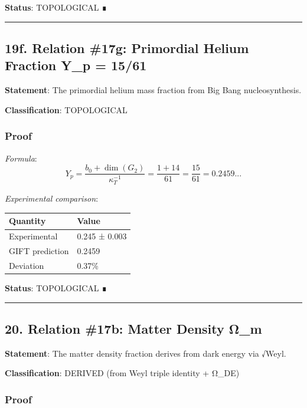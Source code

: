 \documentclass[11pt,a4paper]{article}
\begin{document}
\textbf{Status}: TOPOLOGICAL ∎

\begin{center}\rule{0.5\linewidth}{0.5pt}\end{center}

\subsection{19f. Relation \#17g: Primordial Helium Fraction Y\_p = 15/61}\label{f.-relation-17g-primordial-helium-fraction-y_p-1561}

\textbf{Statement}: The primordial helium mass fraction from Big Bang nucleosynthesis.

\textbf{Classification}: TOPOLOGICAL

\subsubsection{Proof}\label{proof-26}

\emph{Formula}:
\[Y_p = \frac{b_0 + \dim(G_2)}{\kappa_T^{-1}} = \frac{1 + 14}{61} = \frac{15}{61} = 0.2459...\]

\emph{Experimental comparison}:

{\def\LTcaptype{none} %
\begin{longtable}[]{@{}ll@{}}
\toprule\noalign{}
Quantity & Value \\
\midrule\noalign{}
\endhead
\bottomrule\noalign{}
\endlastfoot
Experimental & 0.245 ± 0.003 \\
GIFT prediction & 0.2459 \\
Deviation & 0.37\% \\
\end{longtable}
}

\textbf{Status}: TOPOLOGICAL ∎

\begin{center}\rule{0.5\linewidth}{0.5pt}\end{center}

\subsection{20. Relation \#17b: Matter Density Ω\_m}\label{relation-17b-matter-density-ux3c9_m}

\textbf{Statement}: The matter density fraction derives from dark energy via √Weyl.

\textbf{Classification}: DERIVED (from Weyl triple identity + Ω\_DE)

\subsubsection{Proof}\label{proof-27}
\end{document}
